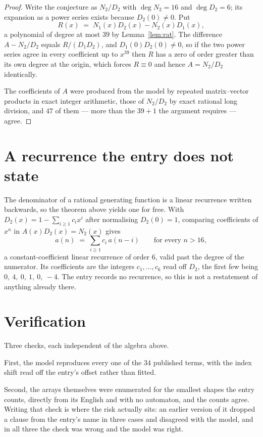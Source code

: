 \documentclass[11pt,a4paper]{article}
\theoremstyle{plain}
\theoremstyle{definition}
\begin{document}
\begin{proof}
Write the conjecture as $N_2/D_2$ with $\deg N_2=16$ and $\deg D_2=6$; its expansion as a
power series exists because $D_2(0)\neq0$. Put
\[
R(x)\;=\;N_1(x)D_2(x)-N_2(x)D_1(x),
\]
a polynomial of degree at most $39$ by Lemma~\ref{lem:rat}. The difference
$A-N_2/D_2$ equals $R/(D_1D_2)$, and $D_1(0)D_2(0)\neq0$, so if the two power series agree in
every coefficient up to $x^{39}$ then $R$ has a zero of order greater than its own
degree at the origin, which forces $R\equiv0$ and hence $A=N_2/D_2$ identically.

The coefficients of $A$ were produced from the model by repeated matrix--vector products in
exact integer arithmetic, those of $N_2/D_2$ by exact rational long division, and $47$
of them --- more than the $39+1$ the argument requires --- agree.
\end{proof}

\section{A recurrence the entry does not state}

The denominator of a rational generating function is a linear recurrence written backwards, so
the theorem above yields one for free. With $D_2(x)=1-\sum_{i\ge1}c_ix^i$ after normalising
$D_2(0)=1$, comparing coefficients of $x^n$ in $A(x)D_2(x)=N_2(x)$ gives
\[
a(n)\;=\;\sum_{i\ge1}c_i\,a(n-i)\qquad\text{for every }n>16,
\]
a constant-coefficient linear recurrence of order $6$, valid past the degree of the
numerator. Its coefficients are the integers $c_1,\dots,c_{6}$ read off $D_2$, the first few being $0,\ 4,\ 0,\ 1,\ 0,\ -4$. The entry records no recurrence, so this is not a restatement of anything
already there.

\section{Verification}

Three checks, each independent of the algebra above.

First, the model reproduces every one of the $34$ published terms, with the index shift
read off the entry's offset rather than fitted.

Second, the arrays themselves were enumerated for the smallest shapes the entry counts,
directly from its English and with no automaton, and the counts agree. Writing that check is
where the risk actually sits: an earlier version of it dropped a clause from the entry's name
in three cases and disagreed with the model, and in all three the check was wrong and the model
was right.
\end{document}
